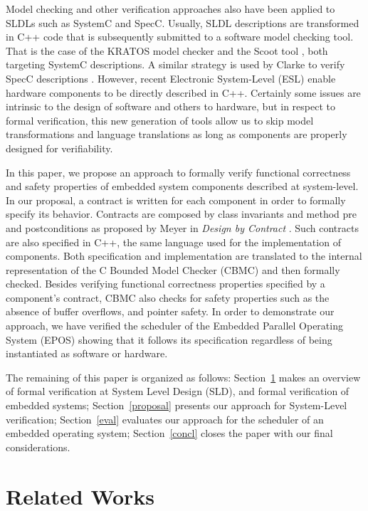 \documentclass{sig-alternate}
\begin{document}
Model checking and other verification approaches also have been applied
to SLDLs such as SystemC and SpecC. Usually, SLDL descriptions are
transformed in C++ code that is subsequently submitted to a software
model checking tool.  That is the case of the KRATOS model checker
\cite{Cimatti:2011} and the Scoot tool \cite{Blanc:2008}, both targeting
SystemC descriptions. A similar strategy is used by Clarke to verify
SpecC descriptions \cite{Clarke:2007}. However, recent Electronic
System-Level (ESL) enable hardware components to be directly described
in C++. Certainly some issues are intrinsic to the design of software
and others to hardware, but in respect to formal verification, this new
generation of tools allow us to skip model transformations and language
translations as long as components are properly designed for
verifiability.

In this paper, we propose an approach to formally verify functional
correctness and safety properties of embedded system components
described at system-level.  In our proposal, a contract is written for
each component in order to formally specify its behavior. Contracts are
composed by class invariants and method pre and postconditions as
proposed by Meyer in \emph{Design by Contract} \cite{Meyer:1992}.  Such
contracts are also specified in C++, the same language used for the
implementation of components.  Both specification and implementation are
translated to the internal representation of the C Bounded Model Checker
(CBMC) \cite{Kroehning:CBMC} and then formally checked.  Besides
verifying functional correctness properties specified by a component's
contract, CBMC also checks for safety properties such as the absence of
buffer overflows, and pointer safety. In order to demonstrate our
approach, we have verified the scheduler of the Embedded Parallel
Operating System (EPOS) \cite{Frohlich:2001} showing that it follows
its specification regardless of being instantiated as software or
hardware.

The remaining of this paper is organized as follows: Section~\ref{sota}
makes an overview of formal verification at System Level Design (SLD),
and formal verification of embedded systems; Section~\ref{proposal}
presents our approach for System-Level verification; Section~\ref{eval}
evaluates our approach for the scheduler of an embedded operating
system; Section~\ref{concl} closes the paper with our final
considerations.

\section{Related Works} \label{sota}
\end{document}
